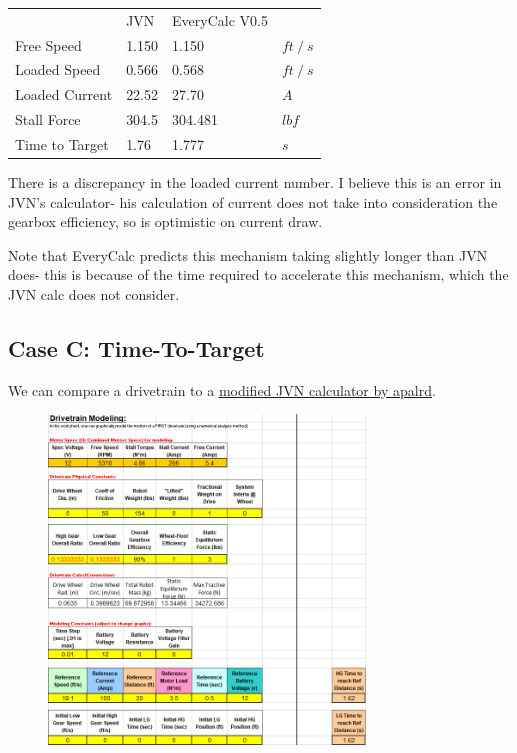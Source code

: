 \documentclass[10pt,letterpaper]{article}
\begin{document}
	\begin{table}[H]
	\begin{tabular}{llll}
	                & JVN & EveryCalc V0.5 & \\ \cline{1-4} 
	Free Speed      & 1.150 & 1.150 & $ft \ / \ s$ \\
	Loaded Speed    & 0.566 & 0.568 & $ft \ / \ s$ \\
	Loaded Current  & 22.52 & 27.70 & $A$ \\
	Stall Force     & 304.5 & 304.481 & $lbf$ \\
	Time to Target  & 1.76  & 1.777 & $s$
	\end{tabular}
	\end{table}

	There is a discrepancy in the loaded current number. I believe this is an error in JVN's calculator- his calculation of current does not take into consideration the gearbox efficiency, so is optimistic on current draw.

	Note that EveryCalc predicts this mechanism taking slightly longer than JVN does- this is because of the time required to accelerate this mechanism, which the JVN calc does not consider.

	\newpage
	\subsection*{Case C: Time-To-Target}
	We can compare a drivetrain to a \href{https://www.chiefdelphi.com/t/paper-jvn-calc-apalrds-time-to-distance/146546}{\underline{modified JVN calculator by apalrd}}.

	\begin{figure}[H]
		\includegraphics[width=0.75\textwidth]{validation/mechanism_JVN_apalrd_C.png}
	\end{figure}
\end{document}
